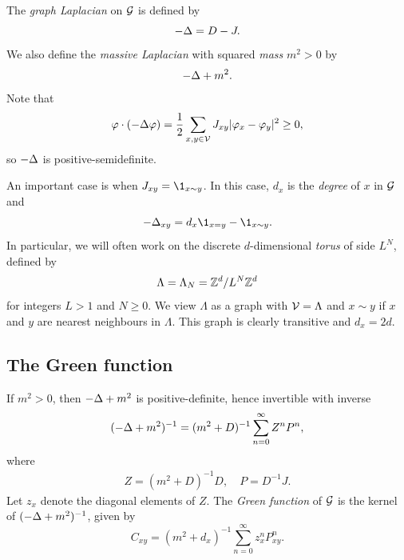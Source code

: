 The \emph{graph Laplacian} on $\mathcal{G}$ is defined by
\begin{equation}
-\Delta = D - J.
\end{equation}
We also define the \emph{massive Laplacian} with squared \emph{mass} $m^2 > 0$ by
\begin{equation}
-\Delta + m^2.
\end{equation}
Note that
\begin{equation}
\label{e:sbp-gen}
\varphi \cdot (-\Delta \varphi)
  =
\frac{1}{2} \sum_{x,y\in\mathcal{V}} J_{xy} |\varphi_x - \varphi_y|^2
  \ge
0,
\end{equation}
so $-\Delta$ is positive-semidefinite.

\begin{example}
An important case is when $\jay_{xy} = \1_{x\sim y}$.
In this case, $d_x$ is the \emph{degree} of $x$ in $\mathcal{G}$ and
\begin{equation}
\label{e:Deltaxy}
-\Delta_{xy} = d_x \1_{x=y} - \1_{x \sim y}.
\end{equation}
In particular, we will often work on the discrete $d$-dimensional \emph{torus}
of side $L^N$, defined by
\begin{equation}
\label{e:Lambda-torus}
\Lambda = \Lambda_N = { {{\mathbb Z}}^d }/L^N{ {{\mathbb Z}}^d }
\end{equation}
for integers $L > 1$ and $N \ge 0$.
We view $\Lambda$ as a graph with $\mathcal{V} = \Lambda$ and $x \sim y$ if
$x$ and $y$ are nearest neighbours in $\Lambda$. This graph is clearly transitive
and $d_x = 2d$.
\end{example}


\subsection{The Green function}

If $m^2 > 0$, then $-\Delta + m^2$ is positive-definite, hence invertible with inverse
\begin{equation}
(-\Delta + m^2)^{-1} = (m^2 + D)^{-1} \sum_{n=0}^\infty Z^n P^n,
\end{equation}
where
\begin{align}
Z = (m^2 + D)^{-1} D,
  \quad
P = D^{-1} J.
\end{align}
Let $z_x$ denote the diagonal elements of $Z$. The \emph{Green function}
of $\mathcal{G}$ is the kernel of $(-\Delta + m^2)^{-1}$, given by
\begin{equation}
\label{e:greendef}
C_{xy}
  =
(m^2 + d_x)^{-1} \sum_{n=0}^\infty z_x^n P^n_{xy}.
\end{equation}

